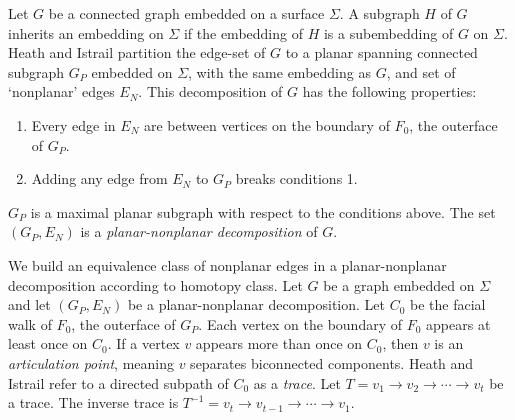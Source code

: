 Let $G$ be a connected graph embedded on a surface $\Sigma$. A subgraph $H$ of $G$ inherits an embedding on $\Sigma$ if the embedding of $H$ is a subembedding of $G$ on $\Sigma$. Heath and Istrail partition the edge-set of \(G\) to a planar spanning connected subgraph \(G_P\) embedded on $\Sigma$, with the same embedding as $G$, and set of `nonplanar' edges $E_N$. This decomposition of $G$ has the following properties:
\begin{enumerate}
	\item Every edge in \(E_N\) are between vertices on the boundary of $F_0$, the outerface of $G_P$.
	\item Adding any edge from $E_N$ to \(G_P\) breaks conditions 1.
\end{enumerate}
$G_P$ is a maximal planar subgraph with respect to the conditions above. The set $(G_P, E_N)$ is a \textit{planar-nonplanar decomposition} of $G$. 


We build an equivalence class of nonplanar edges in a planar-nonplanar decomposition according to homotopy class. Let $G$ be a graph embedded on $\Sigma$ and let $(G_P, E_N)$ be a planar-nonplanar decomposition. Let \(C_0\) be the facial walk of \(F_0\), the outerface of $G_P$. Each vertex on the boundary of \(F_0\) appears at least once on $C_0$. If a vertex $v$ appears more than once on $C_0$, then $v$ is an \textit{articulation point}, meaning $v$ separates biconnected components. Heath and Istrail refer to a directed subpath of \(C_0\) as a \textit{trace}. Let \(T = v_1 \rightarrow v_2 \rightarrow \cdots \rightarrow v_t\) be a trace. The inverse trace is \(T^{-1} = v_t \rightarrow v_{t-1} \rightarrow \cdots \rightarrow v_1\).

